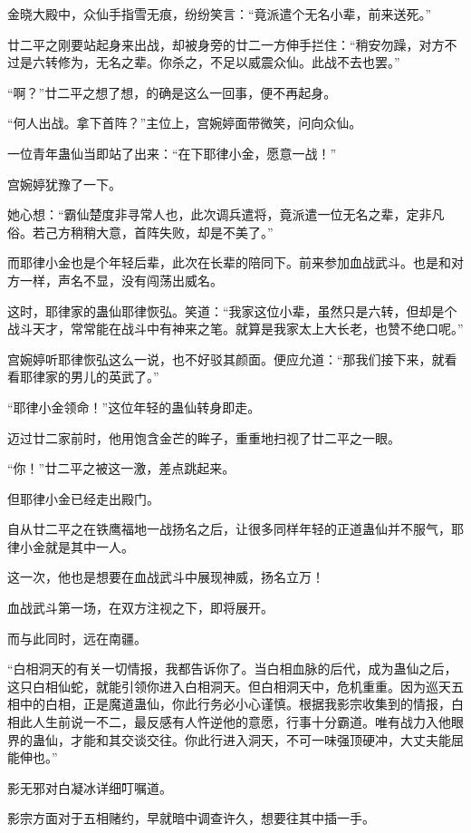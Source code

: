 \begin{this_body}
金晓大殿中，众仙手指雪无痕，纷纷笑言：“竟派遣个无名小辈，前来送死。”

廿二平之刚要站起身来出战，却被身旁的廿二一方伸手拦住：“稍安勿躁，对方不过是六转修为，无名之辈。你杀之，不足以威震众仙。此战不去也罢。”

“啊？”廿二平之想了想，的确是这么一回事，便不再起身。

“何人出战。拿下首阵？”主位上，宫婉婷面带微笑，问向众仙。

一位青年蛊仙当即站了出来：“在下耶律小金，愿意一战！”

宫婉婷犹豫了一下。

她心想：“霸仙楚度非寻常人也，此次调兵遣将，竟派遣一位无名之辈，定非凡俗。若己方稍稍大意，首阵失败，却是不美了。”

而耶律小金也是个年轻后辈，此次在长辈的陪同下。前来参加血战武斗。也是和对方一样，声名不显，没有闯荡出威名。

这时，耶律家的蛊仙耶律恢弘。笑道：“我家这位小辈，虽然只是六转，但却是个战斗天才，常常能在战斗中有神来之笔。就算是我家太上大长老，也赞不绝口呢。”

宫婉婷听耶律恢弘这么一说，也不好驳其颜面。便应允道：“那我们接下来，就看看耶律家的男儿的英武了。”

“耶律小金领命！”这位年轻的蛊仙转身即走。

迈过廿二家前时，他用饱含金芒的眸子，重重地扫视了廿二平之一眼。

“你！”廿二平之被这一激，差点跳起来。

但耶律小金已经走出殿门。

自从廿二平之在铁鹰福地一战扬名之后，让很多同样年轻的正道蛊仙并不服气，耶律小金就是其中一人。

这一次，他也是想要在血战武斗中展现神威，扬名立万！

血战武斗第一场，在双方注视之下，即将展开。

而与此同时，远在南疆。

“白相洞天的有关一切情报，我都告诉你了。当白相血脉的后代，成为蛊仙之后，这只白相仙蛇，就能引领你进入白相洞天。但白相洞天中，危机重重。因为巡天五相中的白相，正是魔道蛊仙，你此行务必小心谨慎。根据我影宗收集到的情报，白相此人生前说一不二，最反感有人忤逆他的意愿，行事十分霸道。唯有战力入他眼界的蛊仙，才能和其交谈交往。你此行进入洞天，不可一味强顶硬冲，大丈夫能屈能伸也。”

影无邪对白凝冰详细叮嘱道。

影宗方面对于五相赌约，早就暗中调查许久，想要往其中插一手。


\end{this_body}
